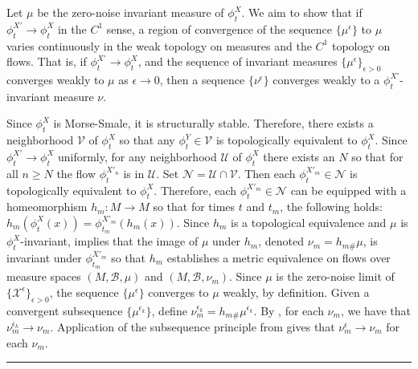\documentclass[12pt]{article}
\newcommand{\BlackBox}{\rule{1.5ex}{1.5ex}}  %
\renewenvironment{proof}{\par\noindent{\bf Proof\ }}{\hfill\BlackBox\\[2mm]}
\newenvironment{proof}{\par\noindent{\bf Proof\ }}{\hfill\BlackBox\\[2mm]}
\begin{document}
\begin{proof}
    Let $\mu$ be the zero-noise invariant measure of $\phi^{X}_t$. We aim to show that if $\phi^{X'}_t \rightarrow \phi^X_t$ in the $C^1$ sense, a region of convergence of the sequence $\{\mu^{\epsilon}\}$ to $\mu$ varies continuously in the weak topology on measures and the $C^1$ topology on flows. That is, if $\phi^{X'}_t \rightarrow \phi^X_t$, and the sequence of invariant measures $\{\mu^{\epsilon}\}_{\epsilon >0}$ converges weakly to $\mu$ as $\epsilon \rightarrow 0$, then a sequence $\{\nu^{\epsilon}\}$ converges weakly to a $\phi^{X'}_t$-invariant measure $\nu$. 
    
    Since $\phi^X_t$ is Morse-Smale, it is structurally stable. Therefore, there exists a neighborhood $\mathcal{V}$ of $\phi^X_t$ so that any $\phi^Y_t \in \mathcal{V}$ is topologically equivalent to $\phi_t^X$. Since $\phi^{X'}_t \rightarrow \phi^X_t$ uniformly, for any neighborhood $\mathcal{U}$ of $\phi^X_t$ there exists an $N$ so that for all $n \geq N$ the flow $\phi_t^{X'_{n}}$ is in $\mathcal{U}$. Set $\mathcal{N} = \mathcal{U} \cap \mathcal{V}$. Then each $\phi_t^{X'_{m}} \in \mathcal{N}$ is topologically equivalent to $\phi_t^X$. Therefore, each $\phi_t^{X'_{m}} \in \mathcal{N}$ can be equipped with a homeomorphism $h_{m}:M \rightarrow M$ so that for times $t$ and $t_m$, the following holds: $h_m(\phi_t^{X}(x)) = \phi_{t_m}^{X'_{m}}(h_m(x))$. Since $h_m$ is a topological equivalence and $\mu$ is $\phi_t^X$-invariant,  implies that the image of $\mu$ under $h_m$, denoted $\nu_{m} = h_{m\#}\mu$, is invariant under $\phi_{t_m}^{X'_{m}}$ so that $h_m$ establishes a metric equivalence on flows over measure spaces $(M,\mathcal{B},\mu)$ and $(M,\mathcal{B},\nu_m)$. Since $\mu$ is the zero-noise limit of $\{\mathcal{X}^{\epsilon}\}_{\epsilon >0}$, the sequence $\{\mu^{\epsilon}\}$ converges to $\mu$ weakly, by definition. Given a convergent subsequence $\{\mu^{\epsilon_{k}}\}$, define $\nu_m^{\epsilon_{k}} = h_{m\#}\mu^{\epsilon_{k}}$. By , for each $\nu_m$, we have that $\nu_m^{\epsilon_{k}} \rightarrow \nu_m$. Application of the subsequence principle from  gives that $\nu_m^{\epsilon} \rightarrow \nu_{m}$ for each $\nu_m$.
\end{proof}
\end{document}
